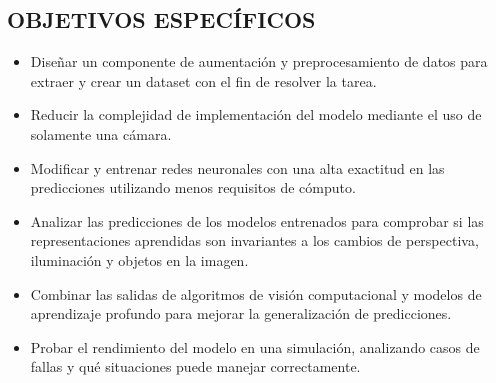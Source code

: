 \subsection{OBJETIVOS ESPECÍFICOS}
\begin{itemize}[nosep]
	\item Diseñar un componente de aumentación y preprocesamiento de datos para extraer y crear un dataset con el fin de resolver la tarea.
    \item Reducir la complejidad de implementación del modelo mediante el uso de solamente una cámara.
    
    \item Modificar y entrenar redes neuronales con una alta exactitud en las predicciones utilizando menos requisitos de cómputo.
    
    \item Analizar las predicciones de los modelos entrenados para comprobar si las representaciones aprendidas son invariantes a los cambios de perspectiva, iluminación y objetos en la imagen.
    
	\item Combinar las salidas de algoritmos de visión computacional y modelos de aprendizaje profundo para mejorar la generalización de predicciones.
    
    \item Probar el rendimiento del modelo en una simulación, analizando casos de fallas y qué situaciones puede manejar correctamente.
\end{itemize}